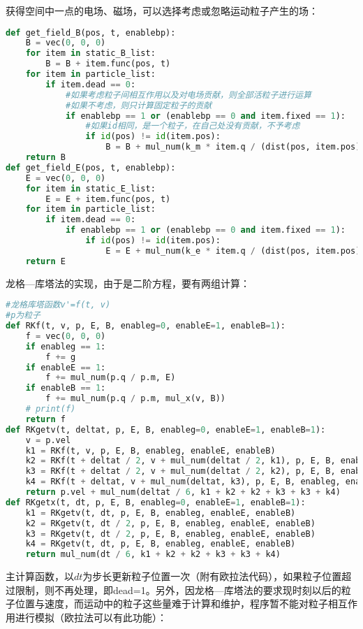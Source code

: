 \documentclass[UTF-8,cs4size]{ctexart}
\begin{document}
获得空间中一点的电场、磁场，可以选择考虑或忽略运动粒子产生的场：
\begin{lstlisting}[language=Python]
def get_field_B(pos, t, enablebp):
    B = vec(0, 0, 0)
    for item in static_B_list:
        B = B + item.func(pos, t)
    for item in particle_list:
        if item.dead == 0:
            #如果考虑粒子间相互作用以及对电场贡献，则全部活粒子进行运算
            #如果不考虑，则只计算固定粒子的贡献
            if enablebp == 1 or (enablebp == 0 and item.fixed == 1):
                #如果id相同，是一个粒子，在自己处没有贡献，不予考虑
                if id(pos) != id(item.pos):
                    B = B + mul_num(k_m * item.q / (dist(pos, item.pos) ** 3), mul_x(item.vel, (pos - item.pos)))
    return B
def get_field_E(pos, t, enablebp):
    E = vec(0, 0, 0)
    for item in static_E_list:
        E = E + item.func(pos, t)
    for item in particle_list:
        if item.dead == 0:
            if enablebp == 1 or (enablebp == 0 and item.fixed == 1):
                if id(pos) != id(item.pos):
                    E = E + mul_num(k_e * item.q / (dist(pos, item.pos) ** 3), pos - item.pos)
    return E
\end{lstlisting}
龙格—库塔法的实现，由于是二阶方程，要有两组计算：
\begin{lstlisting}[language=Python]
#龙格库塔函数v'=f(t, v)
#p为粒子
def RKf(t, v, p, E, B, enableg=0, enableE=1, enableB=1):
    f = vec(0, 0, 0)
    if enableg == 1:
        f += g
    if enableE == 1:
        f += mul_num(p.q / p.m, E)
    if enableB == 1:
        f += mul_num(p.q / p.m, mul_x(v, B))
    # print(f)
    return f
def RKgetv(t, deltat, p, E, B, enableg=0, enableE=1, enableB=1):
    v = p.vel
    k1 = RKf(t, v, p, E, B, enableg, enableE, enableB)
    k2 = RKf(t + deltat / 2, v + mul_num(deltat / 2, k1), p, E, B, enableg, enableE, enableB)
    k3 = RKf(t + deltat / 2, v + mul_num(deltat / 2, k2), p, E, B, enableg, enableE, enableB)
    k4 = RKf(t + deltat, v + mul_num(deltat, k3), p, E, B, enableg, enableE, enableB)
    return p.vel + mul_num(deltat / 6, k1 + k2 + k2 + k3 + k3 + k4)
def RKgetx(t, dt, p, E, B, enableg=0, enableE=1, enableB=1):
    k1 = RKgetv(t, dt, p, E, B, enableg, enableE, enableB)
    k2 = RKgetv(t, dt / 2, p, E, B, enableg, enableE, enableB)
    k3 = RKgetv(t, dt / 2, p, E, B, enableg, enableE, enableB)
    k4 = RKgetv(t, dt, p, E, B, enableg, enableE, enableB)
    return mul_num(dt / 6, k1 + k2 + k2 + k3 + k3 + k4)
\end{lstlisting}
主计算函数，以$dt$为步长更新粒子位置一次（附有欧拉法代码），如果粒子位置超过限制，则不再处理，即dead=1。另外，因龙格—库塔法的要求现时刻以后的粒子位置与速度，而运动中的粒子这些量难于计算和维护，程序暂不能对粒子相互作用进行模拟（欧拉法可以有此功能）：
\end{document}
